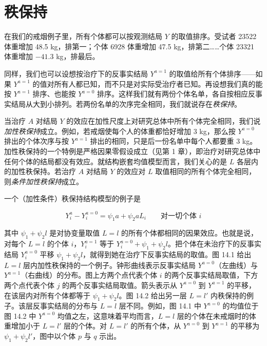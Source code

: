 \section{秩保持}

在我们的戒烟例子里，所有个体都可以按观测结局 $Y$ 的取值排序。受试者 23522 体重增加 48.5 kg，排第一；个体 6928 体重增加 47.5 kg，排第二……个体 23321 体重增加 $-41.3$ kg，排最后。


同样，我们也可以设想按治疗下的反事实结局 $Y^{a=1}$ 的取值给所有个体排序——如果 $Y^{a=1}$ 的值对所有人都已知，而不只是对实际受治疗者已知。再设想我们真的能按 $Y^{a=1}$ 排序、也能按 $Y^{a=0}$ 排序。这样我们就有两份个体名单，各自按相应反事实结局从大到小排列。若两份名单的次序完全相同，我们就说存在\emph{秩保持}。

当治疗 $A$ 对结局 $Y$ 的效应在加性尺度上对研究总体中所有个体完全相同，我们说\emph{加性秩保持}成立。例如，若戒烟使每个人的体重都恰好增加 3 kg，那么按 $Y^{a=0}$ 排出的个体次序与按 $Y^{a=1}$ 排出的相同，只是后一份名单中每个人都要重 3 kg。加性秩保持的一个特例是严格因果零假设成立（见第 1 章），即治疗对研究总体中任何个体的结局都没有效应。就结构嵌套均值模型而言，我们关心的是 $L$ 各层内的加性秩保持。若治疗 $A$ 对结局 $Y$ 的效应对 $L$ 取值相同的所有个体完全相同，则\emph{条件加性秩保持}成立。

一个（加性条件）秩保持结构模型的例子是

\[
Y_i^a-Y_i^{a=0}=\psi_1a+\psi_2aL_i\qquad\text{对一切个体 }i
\]

其中 $\psi_1+\psi_2l$ 是对协变量取值 $L=l$ 的所有个体都相同的因果效应。也就是说，对每个 $L=l$ 的个体 $i$，$Y_i^{a=1}$ 等于 $Y_i^{a=0}+\psi_1+\psi_2l$。把个体在未治疗下的反事实结局 $Y_i^{a=0}$ 平移 $\psi_1+\psi_2l$，就得到她在治疗下反事实结局的取值。图 14.1 给出 $L=l$ 层内加性秩保持的一个例子。钟形曲线表示反事实结局 $Y^{a=0}$（左曲线）与 $Y^{a=1}$（右曲线）的分布。图上方两个点代表个体 $i$ 的两个反事实结局取值，下方两个点代表个体 $j$ 的两个反事实结局取值。箭头表示从 $Y^{a=0}$ 到 $Y^{a=1}$ 的平移，在该层内对所有个体都等于 $\psi_1+\psi_2l$。图 14.2 给出另一层 $L=l'$ 内秩保持的例子。该层反事实结局的分布与 $L=l$ 层不同。例如，图 14.1 中 $Y^{a=0}$ 的均值位于图 14.2 中 $Y^{a=0}$ 均值之左，这意味着平均而言，$L=l$ 层的个体在未戒烟时的体重增加小于 $L=l'$ 层的个体。对 $L=l'$ 的所有个体，从 $Y^{a=0}$ 到 $Y^{a=1}$ 的平移为 $\psi_1+\psi_2l'$，图中以个体 $p$ 与 $q$ 示出。


